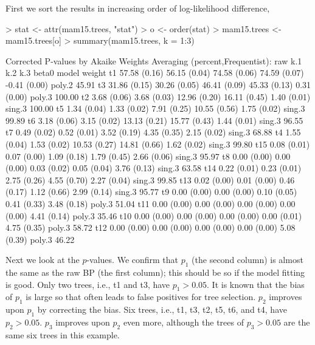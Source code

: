 \documentclass[a4paper]{amsart}
\begin{document}
First we sort the results in increasing order of log-likelihood difference,
\begin{Schunk}
\begin{Sinput}
> stat <- attr(mam15.trees, "stat")
> o <- order(stat)
> mam15.trees <- mam15.trees[o]
> summary(mam15.trees, k = 1:3)
\end{Sinput}
\begin{Soutput}
Corrected P-values by Akaike Weights Averaging (percent,Frequentist):
    raw          k.1          k.2          k.3          beta0        model  weight 
t1  57.58 (0.16) 56.15 (0.04) 74.58 (0.06) 74.59 (0.07) -0.41 (0.00) poly.2  45.91 
t3  31.86 (0.15) 30.26 (0.05) 46.41 (0.09) 45.33 (0.13)  0.31 (0.00) poly.3 100.00 
t2   3.68 (0.06)  3.68 (0.03) 12.96 (0.20) 16.11 (0.45)  1.40 (0.01) sing.3 100.00 
t5   1.34 (0.04)  1.33 (0.02)  7.91 (0.25) 10.55 (0.56)  1.75 (0.02) sing.3  99.89 
t6   3.18 (0.06)  3.15 (0.02) 13.13 (0.21) 15.77 (0.43)  1.44 (0.01) sing.3  96.55 
t7   0.49 (0.02)  0.52 (0.01)  3.52 (0.19)  4.35 (0.35)  2.15 (0.02) sing.3  68.88 
t4   1.55 (0.04)  1.53 (0.02) 10.53 (0.27) 14.81 (0.66)  1.62 (0.02) sing.3  99.80 
t15  0.08 (0.01)  0.07 (0.00)  1.09 (0.18)  1.79 (0.45)  2.66 (0.06) sing.3  95.97 
t8   0.00 (0.00)  0.00 (0.00)  0.03 (0.02)  0.05 (0.04)  3.76 (0.13) sing.3  63.58 
t14  0.22 (0.01)  0.23 (0.01)  2.75 (0.26)  4.55 (0.70)  2.27 (0.04) sing.3  99.85 
t13  0.02 (0.00)  0.01 (0.00)  0.46 (0.17)  1.12 (0.66)  2.99 (0.14) sing.3  95.77 
t9   0.00 (0.00)  0.00 (0.00)  0.10 (0.05)  0.41 (0.33)  3.48 (0.18) poly.3  51.04 
t11  0.00 (0.00)  0.00 (0.00)  0.00 (0.00)  0.00 (0.00)  4.41 (0.14) poly.3  35.46 
t10  0.00 (0.00)  0.00 (0.00)  0.00 (0.00)  0.00 (0.01)  4.75 (0.35) poly.3  58.72 
t12  0.00 (0.00)  0.00 (0.00)  0.00 (0.00)  0.00 (0.00)  5.08 (0.39) poly.3  46.22 
\end{Soutput}
\end{Schunk}

Next we look at the $p$-values. We confirm that $p_1$ (the second
column) is almost the same as the raw BP (the first column); this
should be so if the model fitting is good. Only two trees, i.e., t1
and t3, have $p_1>0.05$. It is known that the bias of $p_1$ is large
so that often leads to false positives for tree selection. $p_2$
improves upon $p_1$ by correcting the bias. Six trees, i.e., t1, t3,
t2, t5, t6, and t4, have $p_2>0.05$. $p_3$ improves upon $p_2$ even
more, although the trees of $p_3>0.05$ are the same six trees in this
example.
\end{document}
